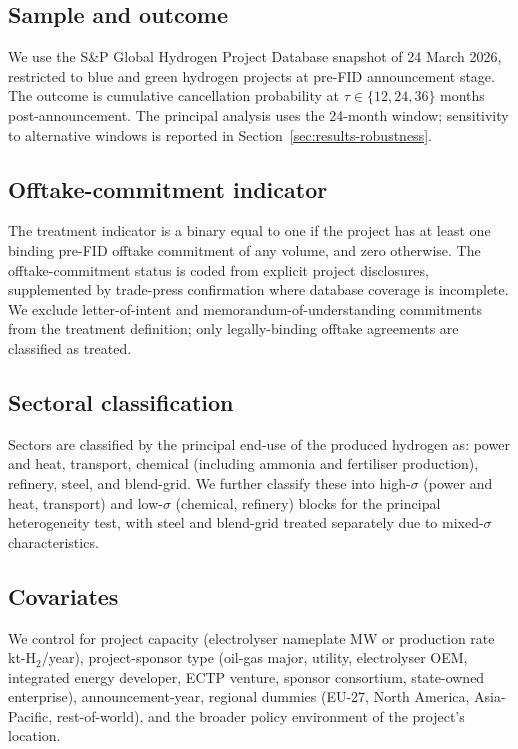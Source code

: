 \documentclass[12pt,a4paper]{article}
\theoremstyle{plain}
\theoremstyle{definition}
\begin{document}
\subsection{Sample and outcome}
\label{sec:data-sample}

We use the S\&P Global Hydrogen Project Database snapshot of 24 March 2026, restricted to blue and green hydrogen projects at pre-FID announcement stage. The outcome is cumulative cancellation probability at $\tau \in \{12, 24, 36\}$ months post-announcement. The principal analysis uses the 24-month window; sensitivity to alternative windows is reported in Section~\ref{sec:results-robustness}.

\subsection{Offtake-commitment indicator}
\label{sec:data-offtake}

The treatment indicator is a binary equal to one if the project has at least one binding pre-FID offtake commitment of any volume, and zero otherwise. The offtake-commitment status is coded from explicit project disclosures, supplemented by trade-press confirmation where database coverage is incomplete. We exclude letter-of-intent and memorandum-of-understanding commitments from the treatment definition; only legally-binding offtake agreements are classified as treated.

\subsection{Sectoral classification}
\label{sec:data-sectors}

Sectors are classified by the principal end-use of the produced hydrogen as: power and heat, transport, chemical (including ammonia and fertiliser production), refinery, steel, and blend-grid. We further classify these into high-$\sigma$ (power and heat, transport) and low-$\sigma$ (chemical, refinery) blocks for the principal heterogeneity test, with steel and blend-grid treated separately due to mixed-$\sigma$ characteristics.

\subsection{Covariates}
\label{sec:data-covariates}

We control for project capacity (electrolyser nameplate MW or production rate kt-H$_2$/year), project-sponsor type (oil-gas major, utility, electrolyser OEM, integrated energy developer, ECTP venture, sponsor consortium, state-owned enterprise), announcement-year, regional dummies (EU-27, North America, Asia-Pacific, rest-of-world), and the broader policy environment of the project's location.
\end{document}

